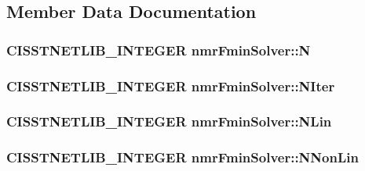 \subsection{Member Data Documentation}
\hypertarget{classnmr_fmin_solver_ab326c4ad9de626447c1ddd93e3be57c1}{
\subsubsection[{N}]{\setlength{\rightskip}{0pt plus 5cm}C\-I\-S\-S\-T\-N\-E\-T\-L\-I\-B\-\_\-\-I\-N\-T\-E\-G\-E\-R nmr\-Fmin\-Solver\-::\-N\hspace{0.3cm}{\ttfamily [protected]}}}\label{classnmr_fmin_solver_ab326c4ad9de626447c1ddd93e3be57c1}
\hypertarget{classnmr_fmin_solver_ab4781ddbf8c710e1758195e8d7024382}{
\subsubsection[{N\-Iter}]{\setlength{\rightskip}{0pt plus 5cm}C\-I\-S\-S\-T\-N\-E\-T\-L\-I\-B\-\_\-\-I\-N\-T\-E\-G\-E\-R nmr\-Fmin\-Solver\-::\-N\-Iter\hspace{0.3cm}{\ttfamily [protected]}}}\label{classnmr_fmin_solver_ab4781ddbf8c710e1758195e8d7024382}
\hypertarget{classnmr_fmin_solver_a0e26ac271bc1782ceacbafd644f2ed8c}{
\subsubsection[{N\-Lin}]{\setlength{\rightskip}{0pt plus 5cm}C\-I\-S\-S\-T\-N\-E\-T\-L\-I\-B\-\_\-\-I\-N\-T\-E\-G\-E\-R nmr\-Fmin\-Solver\-::\-N\-Lin\hspace{0.3cm}{\ttfamily [protected]}}}\label{classnmr_fmin_solver_a0e26ac271bc1782ceacbafd644f2ed8c}
\hypertarget{classnmr_fmin_solver_a3dc96e979c554f7f270cd9957372c801}{
\subsubsection[{N\-Non\-Lin}]{\setlength{\rightskip}{0pt plus 5cm}C\-I\-S\-S\-T\-N\-E\-T\-L\-I\-B\-\_\-\-I\-N\-T\-E\-G\-E\-R nmr\-Fmin\-Solver\-::\-N\-Non\-Lin\hspace{0.3cm}{\ttfamily [protected]}}}\label{classnmr_fmin_solver_a3dc96e979c554f7f270cd9957372c801}
